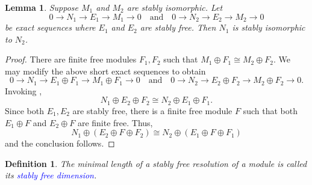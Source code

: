 \documentclass[12pt]{article}
\theoremstyle{thmstyle}
\newtheorem{lemma}[theorem]{Lemma}
\theoremstyle{defstyle}
\newtheorem{definition}[theorem]{Definition}
\newcommand{\define}[1]{\textcolor{blue}{\textit{#1}}}
\begin{document}
\begin{lemma}
    Suppose $M_1$ and $M_2$ are stably isomorphic. Let 
    \begin{equation*}
        0\to N_1\to E_1\to M_1\to 0\quad\text{and}\quad 0\to N_2\to E_2\to M_2\to 0
    \end{equation*}
    be exact sequences where $E_1$ and $E_2$ are stably free. Then $N_1$ is stably isomorphic to $N_2$.
\end{lemma}
\begin{proof}
    There are finite free modules $F_1, F_2$ such that $M_1\oplus F_1\cong M_2\oplus F_2$. We may modify the above short exact sequences to obtain 
    \begin{equation*}
        0\to N_1\to E_1\oplus F_1\to M_1\oplus F_1\to 0\quad\text{and}\quad 0\to N_2\to E_2\oplus F_2\to M_2\oplus F_2\to 0.
    \end{equation*}
    Invoking , 
    \begin{equation*}
        N_1\oplus E_2\oplus F_2\cong N_2\oplus E_1\oplus F_1.
    \end{equation*}
    Since both $E_1, E_2$ are stably free, there is a finite free module $F$ such that both $E_1\oplus F$ and $E_2\oplus F$ are finite free. Thus, 
    \begin{equation*}
        N_1\oplus\left(E_2\oplus F\oplus F_2\right)\cong N_2\oplus\left(E_1\oplus F\oplus F_1\right)
    \end{equation*}
    and the conclusion follows.
\end{proof}

\begin{definition}
    The minimal length of a stably free resolution of a module is called its \define{stably free dimension}.
\end{definition}
\end{document}
